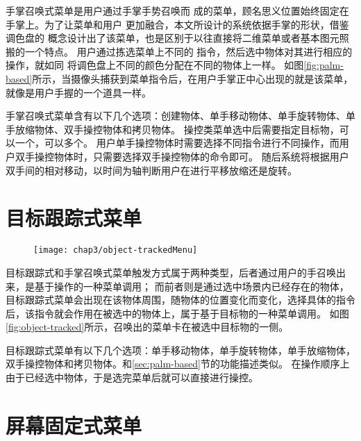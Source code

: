 手掌召唤式菜单是用户通过手掌手势召唤而
成的菜单，顾名思义位置始终固定在手掌上。为了让菜单和用户
更加融合，本文所设计的系统依据手掌的形状，借鉴调色盘的
概念设计出了该菜单，也是区别于以往直接将二维菜单或者基本图元照搬的一个特点。
用户通过拣选菜单上不同的
指令，然后选中物体对其进行相应的操作，就如同
将调色盘上不同的颜色分配在不同的物体上一样。
如图\ref{fig:palm-based}所示，当摄像头捕获到菜单指令后，在用户手掌正中心出现的就是该菜单，就像是用户手握的一个道具一样。

手掌召唤式菜单含有以下几个选项：创建物体、单手移动物体、单手旋转物体、单手放缩物体、双手操控物体和拷贝物体。
操控类菜单选中后需要指定目标物，可以一个，可以多个。
用户单手操控物体时需要选择不同指令进行不同操作，而用户双手操控物体时，只需要选择双手操控物体的命令即可。
随后系统将根据用户双手间的相对移动，以时间为轴判断用户在进行平移放缩还是旋转。

\section{目标跟踪式菜单}
\begin{figure}[!htp]
  \centering
  \texttt{[image: chap3/object-trackedMenu]}
\end{figure}

目标跟踪式和手掌召唤式菜单触发方式属于两种类型，后者通过用户的手召唤出来，是基于操作的一种菜单调用；
而前者则是通过选中场景内已经存在的物体，目标跟踪式菜单会出现在该物体周围，随物体的位置变化而变化，选择具体的指令后，该指令就会作用在被选中的物体上，属于基于目标物的一种菜单调用。
如图\ref{fig:object-tracked}所示，召唤出的菜单卡在被选中目标物的一侧。

目标跟踪式菜单有以下几个选项：单手移动物体，单手旋转物体，单手放缩物体，双手操控物体和拷贝物体。和\ref{sec:palm-based}节的功能描述类似。
在操作顺序上由于已经选中物体，于是选完菜单后就可以直接进行操控。

\section{屏幕固定式菜单}
\begin{figure}[!htp]
  \centering
  \subfigure{\label{fig:screen-fixed:1}}\addtocounter{subfigure}{-2}
	\subfigure{\label{fig:screen-fixed:2}}\addtocounter{subfigure}{-2}
\end{figure}

